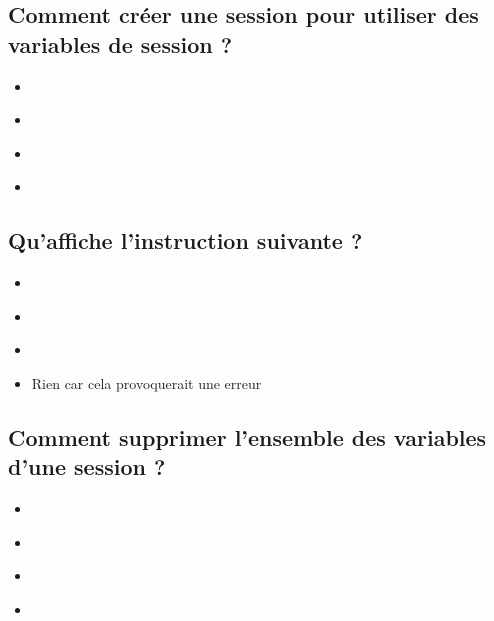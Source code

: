 \documentclass[11pt,a4paper]{article}
\begin{document}
\subsection{Comment créer une session pour utiliser des variables de session ?}

\begin{itemize}
\item[\CaseCoche]  \\
\item[\CaseCoche]  \\  %
\item[\CaseCoche]  \\
\item[\CaseCoche]  \\
\end{itemize}


\subsection{Qu'affiche l'instruction suivante ?}


\bigskip

\begin{itemize}
\item[\CaseCoche]  \\
\item[\CaseCoche]  \\
\item[\CaseCoche]  \\  %
\item[\CaseCoche] Rien car cela provoquerait une erreur \\
\end{itemize}


\subsection{Comment supprimer l'ensemble des variables d'une session ?}

\begin{itemize}
\item[\CaseCoche]  \\
\item[\CaseCoche]  \\  %
\item[\CaseCoche]  \\
\item[\CaseCoche]  \\
\end{itemize}
\end{document}
